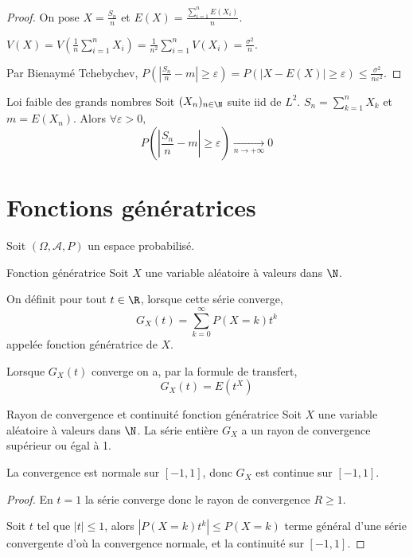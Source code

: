 \begin{proof}
    On pose $X = \frac{S_n}{n}$ et $\displaystyle E(X) = \frac{\sum_{i = 1 }^{n } E(X_i)} n$. 

    $\displaystyle V(X) = V\left( \frac 1 n \sum_{i = 1 }^{ n } X_i \right) = \frac 1 {n^2} \sum_{i = 1 }^{ n } V(X_i) = \frac{\sigma^2}{n}$.

    Par Bienaymé Tchebychev,
    $\displaystyle P\left( \left| \frac{S_n}{n} - m \right| \geqslant \varepsilon \right) = P(|X - E(X)| \geqslant \varepsilon) \leqslant \frac{\sigma^2}{n \varepsilon^2}$.
\end{proof}

\begin{proposition}{Loi faible des grands nombres}{}
    Soit $(X_n)_{n \in \N}$ suite iid de $L^2$. 
    $\displaystyle S_n = \sum_{k = 1 }^{ n } X_k$ et $m = E(X_n)$. Alors 
    $\forall \varepsilon > 0,$  $$P\left( \left| \frac{S_n}{n} - m \right| \geqslant \varepsilon \right) \xrightarrow[n \to + \infty]{} 0$$
\end{proposition}

\section{Fonctions génératrices }

Soit $(\Omega, \mathcal A, P)$ un espace probabilisé. 

\begin{definition}{Fonction génératrice}{}
    Soit $X$ une variable aléatoire à valeurs dans $\N$.

    On définit pour tout $t \in \R$, lorsque cette série converge, 
    $$ G_X(t) = \sum_{k = 0 }^{\infty } P(X = k) t^k $$
    appelée fonction génératrice de $X$.

    Lorsque $G_X(t)$ converge on a, par la formule de transfert,
    $$ G_X(t) = E(t^X) $$
\end{definition}

\begin{theoreme}{Rayon de convergence et continuité fonction génératrice}{}
    Soit $X$ une variable aléatoire à valeurs dans $\N$. La série entière 
    $G_X$ a un rayon de convergence supérieur ou égal à 1. 

    La convergence est normale sur $[-1, 1]$, donc $G_X$ est continue sur $[-1, 1]$.
\end{theoreme}

\begin{proof}
    En $t = 1$ la série converge donc le rayon de convergence $R \geqslant 1$.

    Soit $t $ tel que $|t| \leqslant 1$, alors 
    $|P(X = k) t^k| \leqslant P(X = k)$ terme général d'une série convergente d'où la 
    convergence normale, et la continuité sur $[-1, 1]$.
\end{proof}

